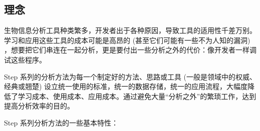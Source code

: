 \documentclass[
]{article}
\begin{document}
\hypertarget{ux7406ux5ff5}{%
\subsection{理念}\label{ux7406ux5ff5}}

生物信息分析工具种类繁多，开发者出于各种原因，导致工具的适用性千差万别。学习和应用这些工具的成本可能是高昂的 (甚至它们可能有一些不为人知的漏洞) ，想要把它们串连在一起分析，更是要付出一些分析之外的代价：像开发者一样调试这些程序。

Step 系列的分析方法为每一个制定好的方法、思路或工具 (一般是领域中的权威、经典或翘楚) 设立统一使用的标准，统一的数据存储，统一的应用流程，大幅度降低了学习成本、使用成本、应用成本。通过避免大量``分析之外''的繁琐工作，达到提高分析效率的目的。

Step 系列分析方法的一些基本特性：
\end{document}
